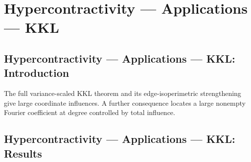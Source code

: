 \section{Hypercontractivity --- Applications --- KKL}
\subsection*{Hypercontractivity --- Applications --- KKL: Introduction}
The full variance-scaled KKL theorem and its edge-isoperimetric strengthening give large coordinate influences. A further consequence locates a large nonempty Fourier coefficient at degree controlled by total influence.

\subsection*{Hypercontractivity --- Applications --- KKL: Results}

